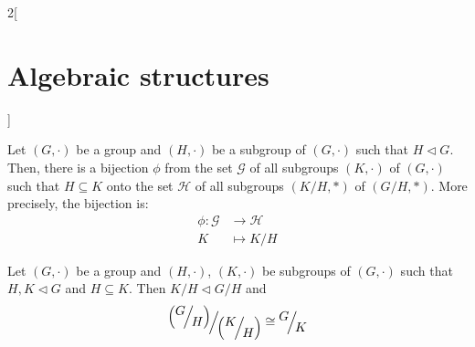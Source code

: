 \documentclass[../../../main.tex]{subfiles}
\begin{document}
\begin{multicols}{2}[\section{Algebraic structures}]
\begin{lemma}
    \end{lemma}
    \begin{theorem}
        Let $(G,\cdot)$ be a group and $(H,\cdot)$ be a subgroup of $(G,\cdot)$ such that $H\lhd G$. Then, there is a bijection $\phi$ from the set $\mathcal{G}$ of all subgroups $(K,\cdot)$ of $(G,\cdot)$ such that $H\subseteq K$ onto the set $\mathcal{H}$ of all subgroups $\left(K/H,*\right)$ of $\left(G/H,*\right)$. More precisely, the bijection is:
        \begin{align*}
            \phi:\mathcal{G} & \longrightarrow\mathcal{H} \\
            K                & \longmapsto K/H
        \end{align*}
    \end{theorem}
    \begin{theorem}
        Let $(G,\cdot)$ be a group and $(H,\cdot)$, $(K,\cdot)$ be subgroups of $(G,\cdot)$ such that $H,K\lhd G$ and $H\subseteq K$. Then $K/H\lhd G/H$ and $$\quot{\left(\quot{G}{H}\right)}{\left(\quot{K}{H}\right)}\cong\quot{G}{K}$$
    \end{theorem}

\end{multicols}
\end{document}
